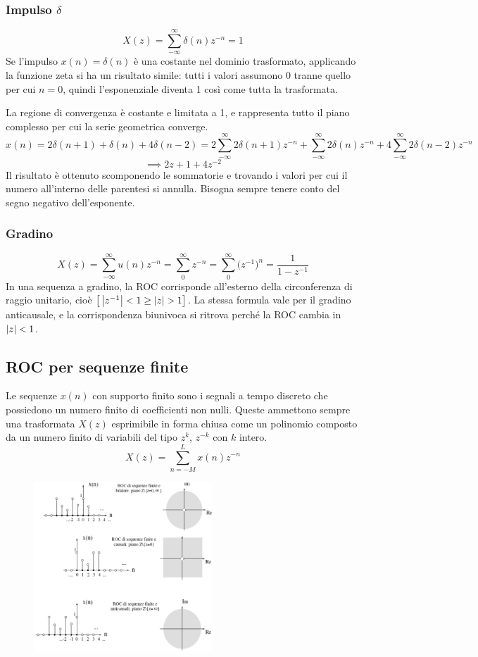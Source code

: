 \subsubsection{Impulso $\delta$}
$$X(z) = \sum_{-\infty}^{\infty} \delta(n) z^{-n} = 1$$
Se l'impulso $x(n) = \delta(n)$ è una costante nel dominio trasformato, applicando la funzione zeta si ha un risultato simile: tutti i valori assumono 0 tranne quello per cui $n = 0$, quindi l'esponenziale diventa 1 così come tutta la trasformata. 

La regione di convergenza è costante e limitata a 1, e rappresenta tutto il piano complesso per cui la serie geometrica converge.
$$x(n) = 2\delta(n+1) + \delta(n) + 4\delta(n-2) = 2\sum_{-\infty}^{\infty}2\delta(n+1)z^{-n} + \sum_{-\infty}^{\infty}2\delta(n)z^{-n} + 4\sum_{-\infty}^{\infty}2\delta(n-2)z^{-n}$$
$$\implies 2z + 1 + 4z^{-2}$$
Il risultato è ottenuto scomponendo le sommatorie e trovando i valori per cui il numero all'interno delle parentesi si annulla. Bisogna sempre tenere conto del segno negativo dell'esponente.

\subsubsection{Gradino}
$$X(z) = \sum_{-\infty}^{\infty}u(n)z^{-n} = \sum_{0}^{\infty}z^{-n} = \sum_{0}^{\infty}\big(z^{-1}\big)^n = \frac{1}{1 - z^{-1}}$$
In una sequenza a gradino, la ROC corrisponde all'esterno della circonferenza di raggio unitario, cioè $\big[\left|z^{-1}\right| < 1 \geq \left|z\right| > 1\big]$. La stessa formula vale per il gradino anticausale, e la corrispondenza biunivoca si ritrova perché la ROC cambia in $\left|z\right| < 1$.

\subsection{ROC per sequenze finite}
Le sequenze $x(n)$ con supporto finito sono i segnali a tempo discreto che possiedono un numero finito di coefficienti non nulli. Queste ammettono sempre una trasformata $X(z)$ esprimibile in forma chiusa come un polinomio composto da un numero finito di variabili del tipo $z^k$, $z^{-k}$ con $k$ intero.
$$X(z) = \sum_{n=-M}^{L} x(n)z^{-n}$$
\begin{figure}
	\includegraphics[width=0.6\textwidth]{Lezioni/Immagini/roc}
	\vspace{-40pt}
\end{figure}

